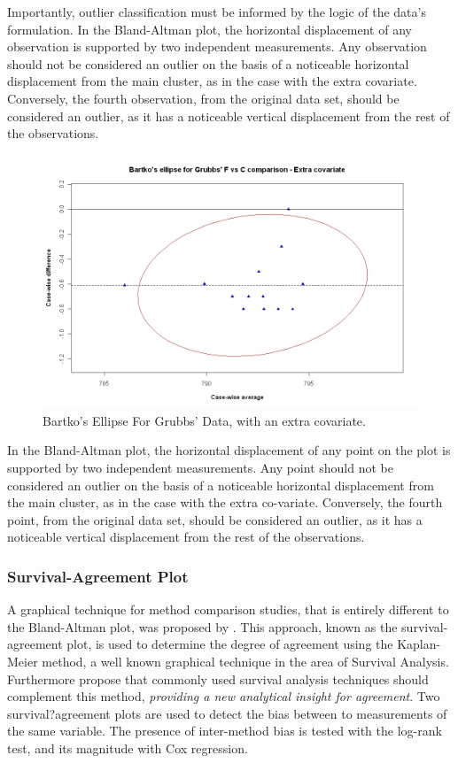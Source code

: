 \documentclass[12pt, a4paper]{report}
\begin{document}
	
	Importantly, outlier classification must be informed by the logic of the
	data's formulation. In the Bland-Altman plot, the horizontal displacement of any
	observation is supported by two independent measurements. Any
	observation should not be considered an outlier on the basis of a
	noticeable horizontal displacement from the main cluster, as in
	the case with the extra covariate. Conversely, the fourth
	observation, from the original data set, should be considered an
	outlier, as it has a noticeable vertical displacement from the
	rest of the observations.
	\newpage
	
	\begin{figure}[h!]
		\includegraphics[width=130mm]{images/GrubbsBartko2.jpeg}
		\caption{Bartko's Ellipse For Grubbs' Data, with an extra covariate.}\label{GrubbsBartko2}
	\end{figure}
	
	In the Bland-Altman plot, the horizontal displacement of any point on the plot is supported by two independent measurements. Any point should not be considered an outlier on the basis of a noticeable horizontal displacement from the main cluster, as in the case with the extra co-variate. Conversely, the fourth point, from the original data set, should be considered an
	outlier, as it has a noticeable vertical displacement from the rest of the observations.
	\newpage
	
	
	\subsubsection{Survival-Agreement Plot}
	A graphical technique for method comparison studies, that is entirely different to the Bland-Altman plot, was proposed by \citet{luiz}. This approach, known as the survival-agreement plot, is used to determine the degree of agreement using the Kaplan-Meier method, a well known graphical technique in the area of Survival Analysis. Furthermore \citet{luiz} propose that commonly used survival analysis techniques should complement this method,\textit{ providing a new analytical insight
		for agreement}. Two survival?agreement plots are used to detect the bias between to measurements of the same variable. The presence of inter-method bias is tested with the log-rank test, and its magnitude with Cox regression.
	
\end{document}
